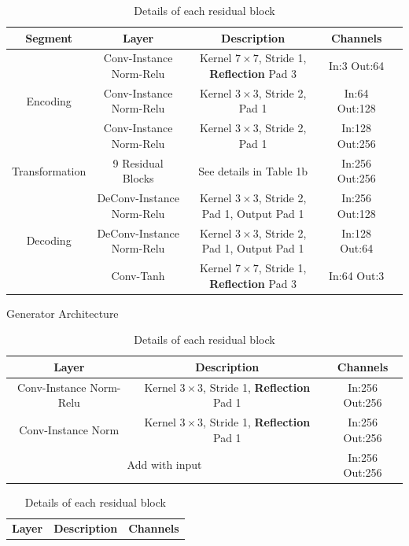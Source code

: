 \documentclass[10pt,twocolumn,letterpaper]{article}
\begin{document}
\begin{table}[ht!]  
\begin{subtable}[h]{\textwidth}
\centering
\begin{tabular}{ |c|c|c|c|c| } 
 \hline
 \textbf{Segment} & \textbf{Layer} & \textbf{Description} &  \textbf{Channels} \\
 \hline
 \multirow{3}{*}{Encoding} & Conv-Instance Norm-Relu & Kernel $7 \times 7$, Stride 1, \textbf{Reflection} Pad 3 & In:3 Out:64 \\
 & Conv-Instance Norm-Relu & Kernel $3 \times 3$, Stride 2, Pad 1 & In:64 Out:128\\
  & Conv-Instance Norm-Relu & Kernel $3 \times 3$, Stride 2, Pad 1 & In:128 Out:256 \\
\hline
Transformation & 9 Residual Blocks & See details in Table 1b & In:256 Out:256\\
\hline
 \multirow{3}{*}{Decoding} & DeConv-Instance Norm-Relu & Kernel $3 \times 3$, Stride 2, Pad 1, Output Pad 1 & In:256 Out:128\\ 
 & DeConv-Instance Norm-Relu & Kernel $3 \times 3$, Stride 2, Pad 1, Output Pad 1 & In:128 Out:64\\ 
  & Conv-Tanh & Kernel $7 \times 7$, Stride 1, \textbf{Reflection} Pad 3 & In:64 Out:3\\ 
  \hline
\end{tabular}
\label{table:generator}
\caption{Generator Architecture}
\end{subtable}
\begin{subtable}[h]{\textwidth}
\centering
\begin{tabular}{ |c|c|c| } 
 \hline
 \textbf{Layer} & \textbf{Description} &  \textbf{Channels} \\
 \hline
Conv-Instance Norm-Relu & Kernel $3 \times 3$, Stride 1, \textbf{Reflection} Pad 1 & In:256 Out:256\\ 
 Conv-Instance Norm & Kernel $3 \times 3$, Stride 1, \textbf{Reflection} Pad 1 & In:256 Out:256\\ 
 \hline
  \multicolumn{2}{|c|}{Add with input} & In:256 Out:256\\
\hline
\end{tabular}
\label{table:res_block}
\caption{Details of each residual block}
\end{subtable}
\begin{subtable}[h]{\textwidth}
\centering
\begin{tabular}{ |c|c|c| } 
 \hline
 \textbf{Layer} & \textbf{Description} &  \textbf{Channels} \\

\end{tabular}
\end{subtable}
\end{table}
\end{document}
